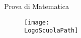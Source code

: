 \documentclass[italian, a4paper]{article}
\newcommand{\Materia}{Matematica}
\begin{document}
Prova di \Materia

\begin{figure}[!ht]\centering
\texttt{[image: \\LogoScuolaPath]}
\end{figure}
\end{document}
